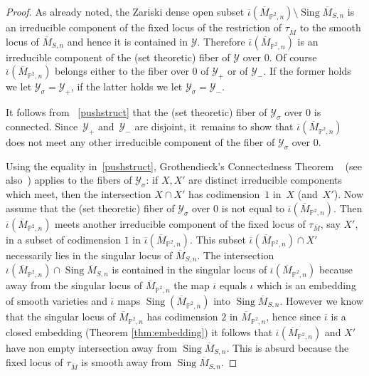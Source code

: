 \documentclass[11pt]{article}
\newcommand{\PP}{{\mathbb P}}\let\P\PP
\newcommand\cY{\mathcal{Y}}
\DeclareMathOperator{\Sing}{Sing}
\let\ov\overline
\theoremstyle{definition}
\def\citestacks#1{\cite[\href{https://stacks.math.columbia.edu/tag/#1}{Tag #1}]{stacks-project}}
\begin{document}
\begin{proof}
As already noted, the Zariski dense open subset
$\ov{\iota}(\ov{M}_{\PP^2,n})\setminus\Sing\overline{M}_{S,n}$ is an irreducible component of the fixed locus of the restriction of $\tau_{\ov{M}}$ to the smooth locus of $\overline{M}_{S,n}$ and hence it is contained in $\cY$.
Therefore $\ov{\iota}(\ov{M}_{\PP^2,n})$ is an irreducible component of the (set theoretic) fiber of $\cY$ over $0$.
Of course $\ov{\iota}(\ov{M}_{\PP^2,n})$ belongs either to the fiber over $0$ of $\cY_{+}$ or of $\cY_{-}$.
If the former holds we let $\cY_{\sigma}=\cY_{+}$, if the latter holds we let $\cY_{\sigma}=\cY_{-}$.

It follows from ~\eqref{pushstruct} that the (set theoretic) fiber of $\cY_{\sigma}$ over $0$ is connected. Since~$\cY_{+}$ and~$\cY_{-}$ are disjoint, it~remains to show that $\ov{\iota}(\ov{M}_{\PP^2,n})$ does not meet any other irreducible component of the fiber of $\cY_{\sigma}$ over $0$.

Using the equality in~\eqref{pushstruct}, Grothendieck's Connectedness Theorem ~\cite[Th.\,7]{Faltings:Formal} (see also~\citestacks{0ECQ}) applies to the fibers of $\cY_{\sigma}$: if $X, X'$ are distinct irreducible components which meet, then the intersection $X\cap X'$ has codimension~$1$ in~$X$ (and~$X'$).
Now assume that the (set theoretic) fiber of $\cY_{\sigma}$ over $0$ is not equal to $\ov{\iota}(\ov{M}_{\PP^2,n})$.
Then $\ov{\iota}(\ov{M}_{\PP^2,n})$ meets another irreducible component of the fixed locus of $\tau_{\ov{M}}$, say $X'$, in a subset of codimension $1$ in $\ov{\iota}(\ov{M}_{\PP^2,n})$. This subset $\ov{\iota}(\ov{M}_{\PP^2,n})\cap X'$ necessarily lies in the singular locus of $\ov{M}_{S,n}$. The intersection $\ov{\iota}(\ov{M}_{\PP^2,n})\cap\Sing\overline{M}_{S,n}$ is contained in the singular locus of $\ov{\iota}(\ov{M}_{\PP^2,n})$ because away from the singular locus of $\ov{M}_{\PP^2,n}$ the map $\ov{\iota}$ equals $\iota$ which is an embedding of smooth varieties and $\ov{\iota}$ maps $\Sing(\ov{M}_{\PP^2,n})$ into $\Sing\overline{M}_{S,n}$. However we know that the singular locus of $\ov{M}_{\PP^2,n}$ has codimension $2$ in $\ov{M}_{\PP^2,n}$, hence since $\ov{\iota}$ is a closed embedding (Theorem \ref{thm:embedding}) it follows that $\ov{\iota}(\ov{M}_{\PP^2,n})$ and $X'$ have non empty intersection away from $\Sing\overline{M}_{S,n}$.
This is absurd because the fixed locus of $\tau_{\ov{M}}$ is smooth away from $\Sing\overline{M}_{S,n}$.
\end{proof}
\end{document}
